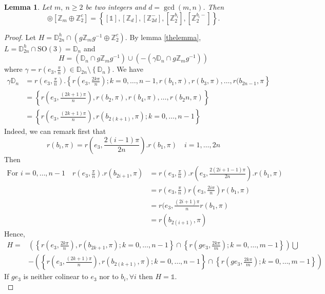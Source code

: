 \documentclass[11pt,a4paper]{amsart}
\newtheorem{lem}[thm]{Lemma}
\theoremstyle{definition}
\newcommand{\ZZ}{\mathbb{Z}}                %
\newcommand{\SO}{\mathrm{SO}}               %
\newcommand{\DD}{\mathbb{D}}                %
\newcommand{\1}{\mathds{1}}		            %
\newcommand{\set}[1]{\left\{#1\right\}}     %
\begin{document}
\begin{lem}
Let $m,\ n \geq 2$ be two integers and $d=\gcd(m,n)$. Then
\begin{equation*}
[\DD_{2n}^{h}] \circledcirc [\ZZ_m \oplus \ZZ_2^c]=\set{[\1],[\ZZ_d],[\ZZ_{2d}^-],[\ZZ_2^{b_i}],[\ZZ_{2}^{b_i-}]}.
\end{equation*}
\end{lem}
\begin{proof}
Let $H=\DD_{2n}^h \cap (g\ZZ_m g^{-1} \oplus \ZZ_2^c)$.
By lemma \ref{thelemma}, $L=\DD_{2n}^h\cap \SO(3)=\DD_n$ and
\begin{equation*}
H=(\DD_n\cap g \ZZ_m g^{-1})\cup (-(\gamma\DD_n\cap g \ZZ_m g^{-1}))
\end{equation*}
where $\gamma=r(e_3,\frac{\pi}{n})\in \DD_{2n}\setminus\set{\DD_n}$.
We have
\begin{align*}
\gamma \DD_n &=r(e_3,\frac{\pi}{n}).\set{r(e_3,\frac{2k\pi}{n});k=0,\dotsc, n-1,r(b_1,\pi),r(b_3,\pi),\dotsc,r(b_{2n-1},\pi}\\
             &=\set{r(e_3,\frac{(2k+1)\pi}{n}),r(b_2,\pi),r(b_4,\pi),\dotsc,r(b_2n,\pi)}\\
             &=\set{r(e_3,\frac{(2k+1)\pi}{n}),r(b_{2(k+1)},\pi);k=0,\dotsc,n-1}
\end{align*}
Indeed, we can remark first that
\begin{equation*}
r(b_i,\pi)=r(e_3,\frac{2(i-1)\pi}{2n}).r(b_1,\pi)\quad i=1,\dotsc,2n
\end{equation*}
Then
\begin{align*}
\text{For } i=0,\dotsc,n-1 \quad r(e_3,\frac{\pi}{n}).r(b_{2i+1},\pi)&=r(e_3,\frac{\pi}{n}).r(e_3,\frac{2(2i+1-1)\pi}{2n}).r(b_1,\pi)\\
                                    &=r(e_3,\frac{\pi}{n})r(e_3,\frac{2i\pi}{n})r(b_1,\pi)\\
                                    &=r(e_3,\frac{(2i+1)\pi}{n}r(b_1,\pi)\\
                                    &=r(b_{2(i+1)},\pi)
\end{align*}
Hence,
\begin{align*}
H=&\left(\set{r(e_3,\frac{2k\pi}{n}),r(b_{2k+1},\pi);k=0,\dotsc, n-1}\cap \set{r(ge_3,\frac{2k\pi}{m});k=0,\dotsc,m-1}\right)\bigcup\\
  &-\left(\set{r(e_3,\frac{(2k+1)\pi}{n}),r(b_{2(k+1)},\pi);k=0,\dotsc,n-1}\cap \set{r(ge_3,\frac{2k\pi}{m});k=0,\dotsc, m-1}\right)
\end{align*}
If $ge_3$ is neither colinear to $e_3$ nor to $b_i,\forall i$ then $H=\1$.\\

\end{proof}
\end{document}
